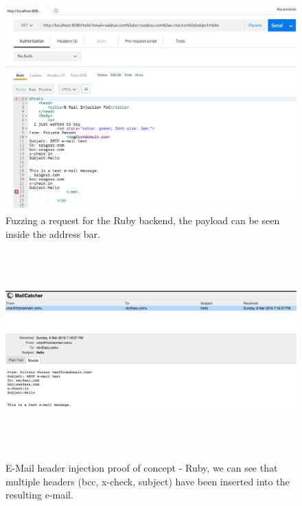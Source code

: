 \begin{figure}[!htbp]
	\centering
	\includegraphics[width=14cm, height=8cm]{System/EMI_Postman_Ruby}
	\caption[]{Fuzzing a request for the Ruby backend, the payload can be seen inside the address bar.}
	\label{fig:postmanruby}
\end{figure}

\begin{figure}[!htbp]
	\centering
	\includegraphics[width=14cm, height=8cm]{System/EMI_Mailcatcher_Ruby}
	\caption[]{E-Mail header injection proof of concept - Ruby, we can see that multiple headers (bcc, x-check, subject) have been inserted into the resulting e-mail.}
	\label{fig:mailcatcherruby}
\end{figure}

